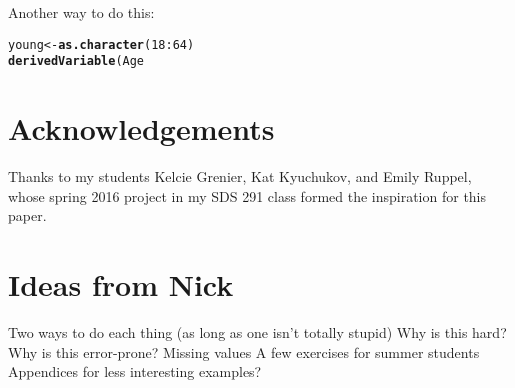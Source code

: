 \documentclass[fleqn,10pt,lineno]{wlpeerj}\usepackage[]{graphicx}\usepackage[]{color}
\makeatletter
\newcommand{\hlstr}[1]{\textcolor[rgb]{0.192,0.494,0.8}{#1}}%
\newcommand{\hlkwd}[1]{\textcolor[rgb]{0.737,0.353,0.396}{\textbf{#1}}}%
\newenvironment{kframe}{%
 \def\at@end@of@kframe{}%
 \ifinner\ifhmode%
  \def\at@end@of@kframe{\end{minipage}}%
  \begin{minipage}{\columnwidth}%
 \fi\fi%
 \def\FrameCommand##1{\hskip\@totalleftmargin \hskip-\fboxsep
 \colorbox{shadecolor}{##1}\hskip-\fboxsep
     \hskip-\linewidth \hskip-\@totalleftmargin \hskip\columnwidth}%
 \MakeFramed {\advance\hsize-\width
   \@totalleftmargin\z@ \linewidth\hsize
   \@setminipage}}%
 {\par\unskip\endMakeFramed%
 \at@end@of@kframe}
\newenvironment{knitrout}{}{} %
\makeatother
\begin{document}
Another way to do this:

\begin{knitrout}\footnotesize
{}\color{fgcolor}\begin{kframe}
\begin{alltt}
young <- \hlkwd{as.character}(18:64)
\hlkwd{derivedVariable}(Age %in% young = \hlstr{"18-65"}, Age )
\end{alltt}
\end{kframe}
\end{knitrout}

\section*{Acknowledgements}

Thanks to my students Kelcie Grenier, Kat Kyuchukov, and Emily Ruppel, whose spring 2016 project in my SDS 291 class formed the inspiration for this paper. 




\section*{Ideas from Nick}
Two ways to do each thing (as long as one isn't totally stupid)
Why is this hard?
Why is this error-prone?
Missing values
A few exercises for summer students
Appendices for less interesting examples?



\end{document}
